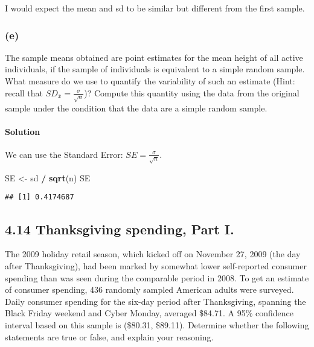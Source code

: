\documentclass[]{article}
\newenvironment{Shaded}{\begin{snugshade}}{\end{snugshade}}
\newcommand{\KeywordTok}[1]{\textcolor[rgb]{0.13,0.29,0.53}{\textbf{#1}}}
\newcommand{\StringTok}[1]{\textcolor[rgb]{0.31,0.60,0.02}{#1}}
\newcommand{\OperatorTok}[1]{\textcolor[rgb]{0.81,0.36,0.00}{\textbf{#1}}}
\newcommand{\NormalTok}[1]{#1}
\let\oldparagraph\paragraph
\renewcommand{\paragraph}[1]{\oldparagraph{#1}\mbox{}}
\begin{document}
I would expect the mean and sd to be similar but different from the
first sample.

\subsubsection{(e)}\label{e}

The sample means obtained are point estimates for the mean height of all
active individuals, if the sample of individuals is equivalent to a
simple random sample. What measure do we use to quantify the variability
of such an estimate (Hint: recall that
\(SD_{\bar x} = \frac{\sigma}{\sqrt{n}}\))? Compute this quantity using
the data from the original sample under the condition that the data are
a simple random sample.

\paragraph{Solution}\label{solution-4}

We can use the Standard Error: \(SE = \frac{\sigma}{\sqrt{n}}\).

\begin{Shaded}
\begin{Highlighting}[]
\NormalTok{SE <-}\StringTok{ }\NormalTok{sd }\OperatorTok{/}\StringTok{ }\KeywordTok{sqrt}\NormalTok{(n)}
\NormalTok{SE}
\end{Highlighting}
\end{Shaded}

\begin{verbatim}
## [1] 0.4174687
\end{verbatim}

\subsection{4.14 Thanksgiving spending, Part
I.}\label{thanksgiving-spending-part-i.}

The 2009 holiday retail season, which kicked off on November 27, 2009
(the day after Thanksgiving), had been marked by somewhat lower
self-reported consumer spending than was seen during the comparable
period in 2008. To get an estimate of consumer spending, 436 randomly
sampled American adults were surveyed. Daily consumer spending for the
six-day period after Thanksgiving, spanning the Black Friday weekend and
Cyber Monday, averaged \$84.71. A 95\% confidence interval based on this
sample is (\$80.31, \$89.11). Determine whether the following statements
are true or false, and explain your reasoning.
\end{document}
